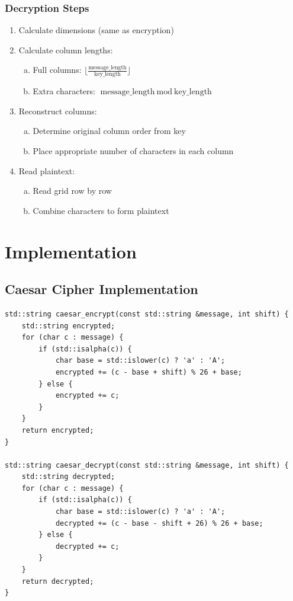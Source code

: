 \documentclass[titlepage]{article}
\begin{document}
\subsubsection{ Decryption Steps}
\begin{enumerate}[1.]
\item Calculate dimensions (same as encryption)
\item Calculate column lengths:
   \begin{enumerate}[a)]
   \item Full columns: $\lfloor\frac{\text{message\_length}}{\text{key\_length}}\rfloor$
   \item Extra characters: $\text{message\_length} \bmod \text{key\_length}$
   \end{enumerate}
\item Reconstruct columns:
   \begin{enumerate}[a)]
   \item Determine original column order from key
   \item Place appropriate number of characters in each column
   \end{enumerate}
\item Read plaintext:
   \begin{enumerate}[a)]
   \item Read grid row by row
   \item Combine characters to form plaintext
   \end{enumerate}
\end{enumerate}
\newpage

\section{Implementation}

\subsection{Caesar Cipher Implementation}
\begin{lstlisting}
std::string caesar_encrypt(const std::string &message, int shift) {
    std::string encrypted;
    for (char c : message) {
        if (std::isalpha(c)) {
            char base = std::islower(c) ? 'a' : 'A';
            encrypted += (c - base + shift) % 26 + base;
        } else {
            encrypted += c;
        }
    }
    return encrypted;
}

std::string caesar_decrypt(const std::string &message, int shift) {
    std::string decrypted;
    for (char c : message) {
        if (std::isalpha(c)) {
            char base = std::islower(c) ? 'a' : 'A';
            decrypted += (c - base - shift + 26) % 26 + base;
        } else {
            decrypted += c;
        }
    }
    return decrypted;
}
\end{lstlisting}
\end{document}
